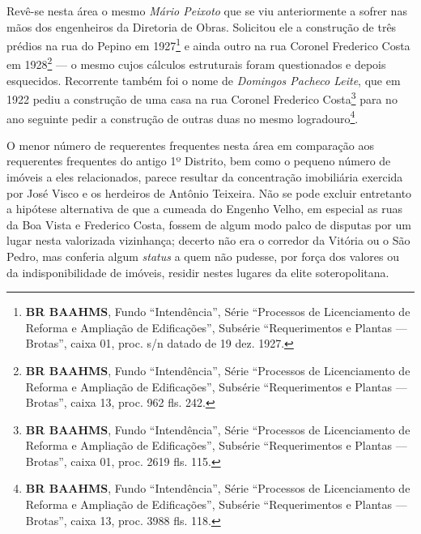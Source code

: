 Revê-se nesta área o mesmo \textit{Mário Peixoto} que se viu anteriormente a sofrer nas mãos dos engenheiros da Diretoria de Obras. Solicitou ele a construção de três prédios na rua do Pepino em 1927\footnote{\textbf{BR BAAHMS}, Fundo ``Intendência'', Série ``Processos de Licenciamento de Reforma e Ampliação de Edificações'', Subsérie ``Requerimentos e Plantas --- Brotas'', caixa 01, proc. s/n datado de 19 dez. 1927.} e ainda outro na rua Coronel Frederico Costa em 1928\footnote{\textbf{BR BAAHMS}, Fundo ``Intendência'', Série ``Processos de Licenciamento de Reforma e Ampliação de Edificações'', Subsérie ``Requerimentos e Plantas --- Brotas'', caixa 13, proc. 962 fls. 242.} --- o mesmo cujos cálculos estruturais foram questionados e depois esquecidos. Recorrente também foi o nome de \textit{Domingos Pacheco Leite}, que em 1922 pediu a construção de uma casa na rua Coronel Frederico Costa\footnote{\textbf{BR BAAHMS}, Fundo ``Intendência'', Série ``Processos de Licenciamento de Reforma e Ampliação de Edificações'', Subsérie ``Requerimentos e Plantas --- Brotas'', caixa 01, proc. 2619 fls. 115.} para no ano seguinte pedir a construção de outras duas no mesmo logradouro\footnote{\textbf{BR BAAHMS}, Fundo ``Intendência'', Série ``Processos de Licenciamento de Reforma e Ampliação de Edificações'', Subsérie ``Requerimentos e Plantas --- Brotas'', caixa 13, proc. 3988 fls. 118.}.

O menor número de requerentes frequentes nesta área em comparação aos requerentes frequentes do antigo 1º Distrito, bem como o pequeno número de imóveis a eles relacionados, parece resultar da concentração imobiliária exercida por José Visco e os herdeiros de Antônio Teixeira. Não se pode excluir entretanto a hipótese alternativa de que a cumeada do Engenho Velho, em especial as ruas da Boa Vista e Frederico Costa, fossem de algum modo palco de disputas por um lugar nesta valorizada vizinhança; decerto não era o corredor da Vitória ou o São Pedro, mas conferia algum \textit{status} a quem não pudesse, por força dos valores ou da indisponibilidade de imóveis, residir nestes lugares da elite soteropolitana. 

